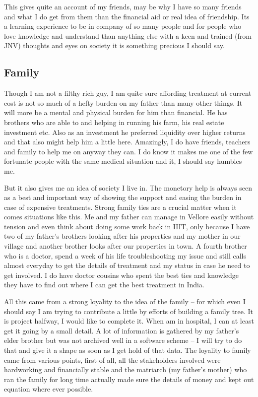 This gives quite an account of my friends, may be why I have so many friends and what I do get from 
them than the financial aid or real idea of friendship. Its a learning experience to be in company 
of so many people and for people who love knowledge and understand than anything else with a keen 
and trained (from JNV) thoughts and eyes on society it is something precious I should say.   


\subsection*{Family}
   
Though I am not a filthy rich guy, I am quite sure affording treatment at current cost is not so 
much of a hefty burden on my father than many other things. It will more be a mental and physical 
burden for him than financial. He has brothers who are able to and helping in running his farm, 
his real estate investment etc. Also as an investment he preferred liquidity over higher returns 
and that also might help him a little here. Amazingly, I do have friends, teachers and family to 
help me on anyway they can. I do know it makes me one of the few fortunate people with the same 
medical situation and it, I should say humbles me. 

But it also gives me an idea of society I live in. The monetory help is always seen as a best 
and important way of showing the support and easing the burden in case of expensive treatments. 
Strong family ties are a crucial matter when it comes situations like this. Me and my father can 
manage in Vellore easily without tension and even think about doing some work back in IIIT, only 
because I have two of my father's brothers looking after his properties and my mother in our 
village and another brother looks after our properties in town. A fourth brother who is a doctor, 
spend a week of his life troubleshooting my issue and still calls almost everyday to get the 
details of treatment and my status in case he need to get involved. I do have doctor cousins 
who spent the best ties and knowledge they have to find out where I can get the best treatment in India. 

All this came from a strong loyality to the idea of the family -- for which even I should say I am
trying to contribute a little by efforts of building a family tree. It is project halfway, I would 
like to complete it. When am in hospital, I can at least get it going by a small detail. A lot of
information is gathered by my father's elder brother but was not archived well in a software scheme 
-- I will try to do that and give it a shape as soon as I get hold of that data. The loyality to 
family came from various points, first of all, all the stakeholders involved were hardworking and
financially stable and the matriarch (my father's mother) who ran the family for long time actually 
made sure the details of money and kept out equation where ever possible. 


